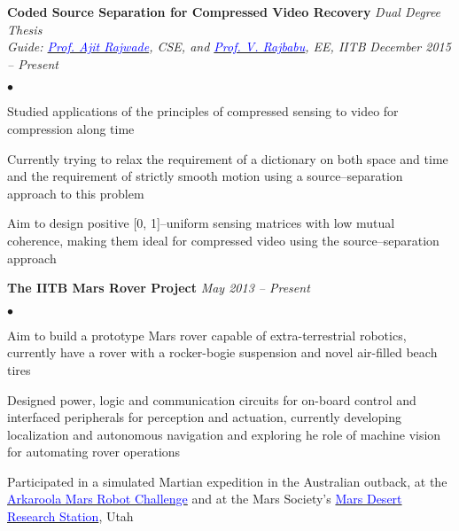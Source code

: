 \documentclass[margin,line]{res}
\newenvironment{list2}{
  \begin{list}{$\bullet$}{%
      \setlength{\itemsep}{0in}
      \setlength{\parsep}{0in} \setlength{\parskip}{0in}
      \setlength{\topsep}{0in} \setlength{\partopsep}{0in} 
      \setlength{\leftmargin}{0.2in}}}{\end{list}}
\begin{document}
\begin{resume}
\vspace*{-0.13in}

{\bf Coded Source Separation for Compressed Video Recovery} \hfill \textit{Dual Degree Thesis} \\
{\em Guide: \href{https://www.cse.iitb.ac.in/~ajitvr}{\textcolor{blue}{Prof. Ajit Rajwade}}, CSE, and \href{https://www.ee.iitb.ac.in/wiki/faculty/rajbabu}{\textcolor{blue}{Prof. V. Rajbabu}}, EE, IITB} \hfill {\it December 2015 -- Present} \\
\vspace*{-.13in}
\begin{list2}
\item Studied applications of the principles of compressed sensing to video for compression along time
\item Currently trying to relax the requirement of a dictionary on both space and time and the requirement of strictly smooth motion using a source--separation approach to this problem
\item Aim to design positive [0, 1]--uniform sensing matrices with low mutual coherence, making them ideal for compressed video using the source--separation approach
\end{list2}

\vspace*{-0.13in}

{\bf The IITB Mars Rover Project}
\hfill {\it May 2013 -- Present} \\
\vspace*{-.13in}
\begin{list2}
\item Aim to build a prototype Mars rover capable of extra-terrestrial robotics, currently have a rover with a rocker-bogie suspension and novel air-filled beach tires
\item Designed power, logic and communication circuits for on-board control and interfaced peripherals for perception and actuation, currently developing localization and autonomous navigation and exploring he role of machine vision for automating rover operations
\item Participated in a simulated Martian expedition in the Australian outback, at the \href{http://marssociety.org.au/article/arkaroola-mars-robot-challenge-spaceward-bound-expedition}{\textcolor{blue} {Arkaroola Mars Robot Challenge}} and at the Mars Society's \href{http://mdrs.marssociety.org/}{\textcolor{blue} {Mars Desert Research Station}}, Utah
\end{list2}


\end{resume}
\end{document}
